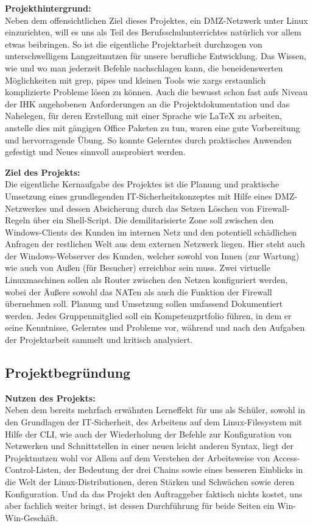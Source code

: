     \textbf{Projekthintergrund:}\\
    Neben dem offensichtlichen Ziel dieses Projektes, ein DMZ-Netzwerk unter Linux einzurichten, will es uns als Teil des Berufsschulunterrichtes natürlich vor allem etwas beibringen. So ist die eigentliche Projektarbeit durchzogen von unterschwelligem Langzeitnutzen für unsere berufliche Entwicklung. Das Wissen, wie und wo man jederzeit Befehle nachschlagen kann, die beneidenswerten Möglichkeiten mit grep, pipes und kleinen Tools wie xargs erstaunlich komplizierte Probleme lösen zu können. Auch die bewusst schon fast aufs Niveau der IHK angehobenen Anforderungen an die Projektdokumentation und das Nahelegen, für deren Erstellung mit einer Sprache wie \LaTeX{} zu arbeiten, anstelle dies mit gängigen Office Paketen zu tun, waren eine gute Vorbereitung und hervorragende Übung. So konnte Gelerntes durch praktisches Anwenden gefestigt und Neues sinnvoll ausprobiert werden.
    
    \textbf{Ziel des Projekts:}\\
    Die eigentliche Kernaufgabe des Projektes ist die Planung und praktische Umsetzung eines grundlegenden IT-Sicherheitskonzeptes mit Hilfe eines DMZ-Netzwerkes und dessen Absicherung durch das Setzen \bzw Löschen von Firewall-Regeln über ein Shell-Script. Die demilitarisierte Zone soll zwischen den Windows-Clients des Kunden im internen Netz und den potentiell schädlichen Anfragen der restlichen Welt aus dem externen Netzwerk liegen. Hier steht auch der Windows-Webserver des Kunden, welcher sowohl von Innen (zur Wartung) wie auch von Außen (für Besucher) erreichbar sein muss. Zwei virtuelle Linuxmaschinen sollen als Router zwischen den Netzen konfiguriert werden, wobei der Äußere sowohl das NATen als auch die Funktion der Firewall übernehmen soll. Planung und Umsetzung sollen umfassend Dokumentiert werden. Jedes Gruppenmitglied soll ein Kompetenzprtfolio führen, in dem er seine Kenntnisse, Gelerntes und Probleme vor, während und nach den Aufgaben der Projektarbeit sammelt und kritisch analysiert.

\subsection{Projektbegründung} 
\label{sec:Projektbegruendung}

	\textbf{Nutzen des Projekts:}\\
    Neben dem bereits mehrfach erwähnten Lerneffekt für uns als Schüler, sowohl in den Grundlagen der IT-Sicherheit, des Arbeitens auf dem Linux-Filesystem mit Hilfe der CLI, wie auch der Wiederholung der Befehle zur Konfiguration von Netzwerken und Schnittstellen in einer neuen leicht anderen Syntax, liegt der Projektnutzen wohl vor Allem auf dem Verstehen der Arbeitsweise von Access-Control-Listen, der Bedeutung der drei Chains sowie eines besseren Einblicks in die Welt der Linux-Distributionen, deren Stärken und Schwächen sowie deren Konfiguration. Und da das Projekt den Auftraggeber faktisch nichts kostet, uns aber fachlich weiter bringt, ist dessen Durchführung für beide Seiten ein Win-Win-Geschäft.
    
